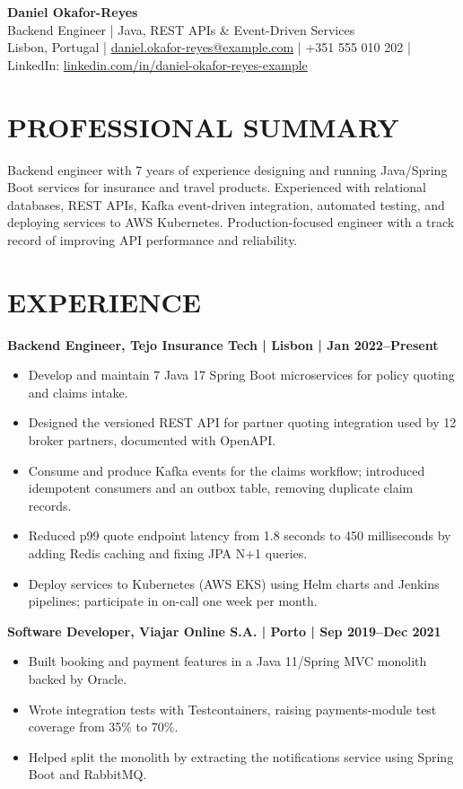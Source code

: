 \documentclass[11pt,a4paper]{article}
\newcommand{\cvsection}[1]{\section*{#1}}
\begin{document}
\begin{center}
{\Huge\bfseries\color{primarycolor} Daniel Okafor-Reyes}\\[0.3em]
{\large\color{accentcolor} Backend Engineer | Java, REST APIs \& Event-Driven Services}\\[0.3em]
Lisbon, Portugal | \href{mailto:daniel.okafor-reyes@example.com}{daniel.okafor-reyes@example.com} | +351 555 010 202 | LinkedIn: \url{linkedin.com/in/daniel-okafor-reyes-example}
\end{center}

\cvsection{PROFESSIONAL SUMMARY}
Backend engineer with 7 years of experience designing and running Java/Spring Boot services for insurance and travel products. Experienced with relational databases, REST APIs, Kafka event-driven integration, automated testing, and deploying services to AWS Kubernetes. Production-focused engineer with a track record of improving API performance and reliability.

\cvsection{EXPERIENCE}
\textbf{Backend Engineer, Tejo Insurance Tech | Lisbon | Jan 2022–Present}
\begin{itemize}
\item Develop and maintain 7 Java 17 Spring Boot microservices for policy quoting and claims intake.
\item Designed the versioned REST API for partner quoting integration used by 12 broker partners, documented with OpenAPI.
\item Consume and produce Kafka events for the claims workflow; introduced idempotent consumers and an outbox table, removing duplicate claim records.
\item Reduced p99 quote endpoint latency from 1.8 seconds to 450 milliseconds by adding Redis caching and fixing JPA N+1 queries.
\item Deploy services to Kubernetes (AWS EKS) using Helm charts and Jenkins pipelines; participate in on-call one week per month.
\end{itemize}

\textbf{Software Developer, Viajar Online S.A. | Porto | Sep 2019–Dec 2021}
\begin{itemize}
\item Built booking and payment features in a Java 11/Spring MVC monolith backed by Oracle.
\item Wrote integration tests with Testcontainers, raising payments-module test coverage from 35\% to 70\%.
\item Helped split the monolith by extracting the notifications service using Spring Boot and RabbitMQ.
\end{itemize}
\end{document}
